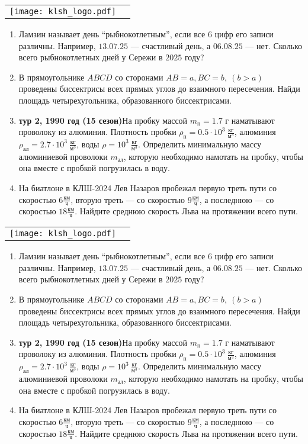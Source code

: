 \documentclass[11pt]{article} %
\newcommand{\shortname}{ФМТ. Тур 1.} %
\newcommand{\putlogo}{
\begin{center}
\begin{tabular}{cc}
\texttt{[image: klsh\_logo.pdf]} &
\raisebox{1cm}{
    {\Large\bf \shortname \hspace*{8cm} КЛШ $50$}
}
\end{tabular}
\end{center}
}
\newcommand{\easymath}{
    Ламзин называет день “рыбнокотлетным”, если все $6$ цифр его записи различны. Например, $13.07.25$ — счастливый день, а $06.08.25$ — нет. Сколько всего рыбнокотлетных дней у Сережи в $2025$ году?
}
\newcommand{\hardmath}{
    В прямоугольнике $ABCD$ со сторонами $AB = a, BC = b,\ (b > a)$ проведены биссектрисы всех прямых углов до взаимного пересечения. Найди площадь четырехугольника, образованного биссектрисами.
}
\newcommand{\easyphys}{
    \textbf{тур 2, 1990 год (15 сезон)}\quad На пробку массой $m_{\text{п}} = 1.7$ г наматывают проволоку из алюминия. Плотность пробки $\rho_{\text{п}} = 0.5 \cdot 10^3\ \frac{\text{кг}}{\text{м}^3}$, алюминия $\rho_{\text{ал}} = 2.7 \cdot 10^3\ \frac{\text{кг}}{\text{м}^3}$, воды $\rho = 10^3\ \frac{\text{кг}}{\text{м}^3}$. Определить минимальную массу алюминиевой проволоки $m_{\text{ал}}$, которую необходимо намотать на пробку, чтобы она вместе с пробкой погрузилась в воду.
}
\newcommand{\hardphys}{
    На биатлоне в КЛШ-2024 Лев Назаров пробежал первую треть пути со скоростью $6 \frac{\text{км}}{\text{ч}}$, вторую треть — со скоростью $9 \frac{\text{км}}{\text{ч}}$, а последнюю — со скоростью $18 \frac{\text{км}}{\text{ч}}$. Найдите среднюю скорость Льва на протяжении всего пути.
}
\begin{document}
\newpage %
\putlogo

\begin{enumerate}
    \item \easymath
    \item \hardmath
    \item \easyphys
    \item \hardphys
\end{enumerate}

\vfill

\putlogo

\begin{enumerate}
    \item \easymath
    \item \hardmath
    \item \easyphys
    \item \hardphys
\end{enumerate}
\end{document}
